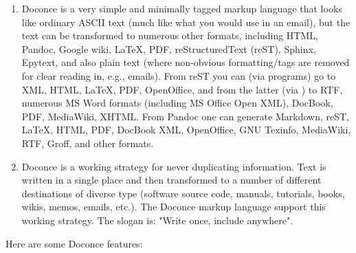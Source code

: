 \documentclass{book}
\begin{document}
\begin{enumerate}
 \item Doconce is a very simple and minimally tagged markup language that
    looks like ordinary ASCII text (much like what you would use in an
    email), but the text can be transformed to numerous other formats,
    including HTML, Pandoc, Google wiki, {\LaTeX}, PDF, reStructuredText
    (reST), Sphinx, Epytext, and also plain text (where non-obvious
    formatting/tags are removed for clear reading in, e.g.,
    emails). From reST you can (via  programs) go to XML, HTML,
    {\LaTeX}, PDF, OpenOffice, and from the latter (via ) to
    RTF, numerous MS Word formats (including MS Office Open XML),
    DocBook, PDF, MediaWiki, XHTML. From Pandoc one can generate
    Markdown, reST, {\LaTeX}, HTML, PDF, DocBook XML, OpenOffice, GNU
    Texinfo, MediaWiki, RTF, Groff, and other formats.

 \item Doconce is a working strategy for never duplicating information.
    Text is written in a single place and then transformed to
    a number of different destinations of diverse type (software
    source code, manuals, tutorials, books, wikis, memos, emails, etc.).
    The Doconce markup language support this working strategy.
    The slogan is: "Write once, include anywhere".
\end{enumerate}

\noindent
Here are some Doconce features:
\end{document}
